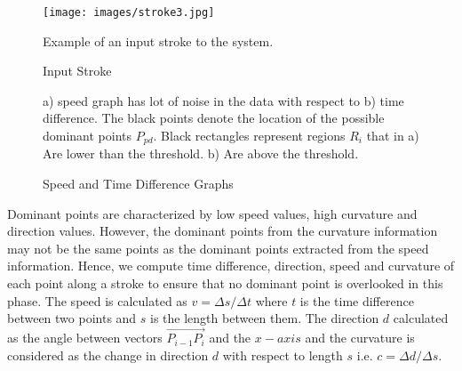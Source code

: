 \documentclass[preprint,1p,times,review]{elsarticle}
\begin{document}
 \begin{figure}[h]
	\centering
		\texttt{[image: images/stroke3.jpg]}
	\caption{Input Stroke} Example of an input stroke to the system.
	\label{fig:orignalStroke}
\end{figure}

 \begin{figure}
	\centering
			\hfill
	\caption{Speed and Time Difference Graphs}  a) speed graph has lot of
noise in the data with respect to b) time difference.   The black points denote
the location of the possible dominant points $P_{pd}$. Black rectangles
represent regions $R_i$ that in a) Are lower than the threshold. b) Are above
the threshold.
	\label{fig:speed2Distance}
\end{figure}

Dominant points are characterized by low speed values, high curvature and
direction values. However, the dominant points from the curvature information
may not be the same points as the dominant points extracted from the speed
information. Hence, we compute time difference, direction, speed and curvature
of each point along a stroke to ensure that no dominant point is overlooked in
this phase. The speed is calculated as $v=\Delta s/\Delta t$ where $t$ is the
time difference between two points and $s$ is the length between them. The
direction $d$ calculated as the angle between vectors $\overrightarrow {P_{i -
1} P_i }$ and the $x-axis$ and the curvature is considered as the change in
direction $d$ with respect to length $s$ i.e. $c= \Delta d/\Delta s$.
\end{document}
